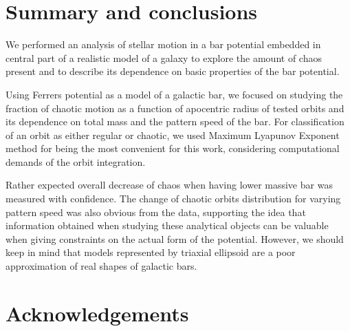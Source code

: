 \documentclass[a4paper,fleqn,usenatbib]{mnras}
\begin{document}


\section{Summary and conclusions}

We performed an analysis of stellar motion in a bar potential embedded in central part of a realistic model of a galaxy to explore the amount of chaos present and to describe its dependence on basic properties of the bar potential.

Using Ferrers potential as a model of a galactic bar, we focused on studying the fraction of chaotic motion as a function of apocentric radius of tested orbits and its dependence on total mass and the pattern speed of the bar. For classification of an orbit as either regular or chaotic, we used Maximum Lyapunov Exponent method for being the most convenient for this work, considering computational demands of the orbit integration.

Rather expected overall decrease of chaos when having lower massive bar was measured with confidence. The change of chaotic orbits distribution for varying pattern speed was also obvious from the data, supporting the idea that information obtained when studying these analytical objects can be valuable when giving constraints on the actual form of the potential. However, we should keep in mind that models represented by triaxial ellipsoid are a poor approximation of real shapes of galactic bars.  
\\


\section*{Acknowledgements}
\end{document}
